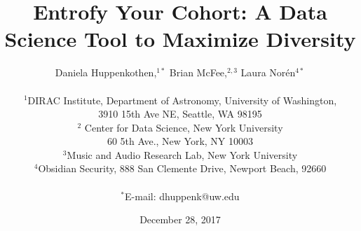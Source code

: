 \documentclass[12pt]{article}
\begin{document}

\title{Entrofy Your Cohort: A Data Science Tool to Maximize Diversity} 




\author
{Daniela Huppenkothen,${}^{1\ast}$ Brian McFee,${}^{2,3}$ Laura Nor\'{e}n${}^{4\ast}$\\
\\
\normalsize{${}^{1}$DIRAC Institute, Department of Astronomy, University of Washington,}\\
\normalsize{3910 15th Ave NE, Seattle, WA 98195}\\
\normalsize{${}^{2}$ Center for Data Science, New York University}\\
\normalsize{60 5th Ave., New York, NY 10003}\\
\normalsize{${}^{3}$Music and Audio Research Lab, New York University}\\
\normalsize{${}^{4}$Obsidian Security, 888 San Clemente Drive, Newport Beach, 92660}\\
\\
\normalsize{$^\ast$E-mail:  dhuppenk@uw.edu}
}




\date{December 28, 2017}%
\end{document}
